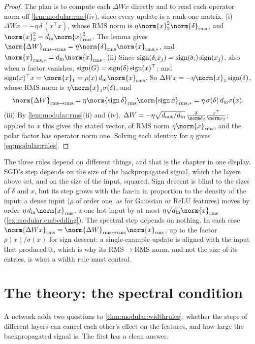 \begin{refsection}
\begin{proof}
The plan is to compute each $\Delta Wx$ directly and to read each operator norm off \cref{lem:modular:rms}(iv), since every update is a rank-one matrix. (i) $\Delta Wx=-\eta\,\delta\,(x^\top x)$, whose RMS norm is $\eta\norm{x}_2^2\norm{\delta}_\rms$, and $\norm{x}_2^2=\modularin\norm{x}_\rms^2$. The lemma gives $\norm{\Delta W}_{\rms\to\rms}=\eta\norm{\delta}_\rms\norm{x}_{\rms,*}$, and $\norm{x}_{\rms,*}=\modularin\norm{x}_\rms$. (ii) Since $\operatorname{sign}(\delta_ix_j)=\operatorname{sign}(\delta_i)\operatorname{sign}(x_j)$, also when a factor vanishes, $\operatorname{sign}(G)=\operatorname{sign}(\delta)\operatorname{sign}(x)^\top$; and $\sign(x)^\top x=\norm{x}_1=\rho(x)\,\modularin\norm{x}_\rms$. So $\Delta Wx=-\eta\norm{x}_1\sign(\delta)$, whose RMS norm is $\eta\norm{x}_1\sigma(\delta)$, and
\[
  \norm{\Delta W}_{\rms\to\rms}=\eta\norm{\sign\delta}_\rms\norm{\sign x}_{\rms,*}=\eta\,\sigma(\delta)\,\modularin\sigma(x).
\] (iii) By \cref{lem:modular:rms}(ii) and (iv), $\Delta W=-\eta\sqrt{\modularout/\modularin}\,\frac{\delta}{\norm\delta_2}\frac{x^\top}{\norm x_2}$; applied to $x$ this gives the stated vector, of RMS norm $\eta\norm{x}_\rms$, and the polar factor has operator norm one. Solving each identity for $\eta$ gives \eqref{eq:modular:rules}.
\end{proof}

The three rules depend on different things, and that is the chapter in one display. SGD's step depends on the size of the backpropagated signal, which the layers above set, and on the size of the input, squared. Sign descent is blind to the sizes of $\delta$ and $x$, but its step grows with the fan-in in proportion to the density of the input: a dense input ($\rho$ of order one, as for Gaussian or ReLU features) moves by order $\eta\,\modularin\norm{x}_\rms$, a one-hot input by at most $\eta\sqrt{\modularin}\norm{x}_\rms$ (\cref{ex:modular:embedding}). The spectral step depends on nothing. In each case $\norm{\Delta Wx}_\rms=\norm{\Delta W}_{\rms\to\rms}\norm{x}_\rms$, up to the factor $\rho(x)/\sigma(x)$ for sign descent: a single-example update is aligned with the input that produced it, which is why its RMS$\to$RMS norm, and not the size of its entries, is what a width rule must control.

\section{The theory: the spectral condition}\label{sec:modular:spectral}

A network adds two questions to \cref{thm:modular:widthrules}: whether the steps of different layers can cancel each other's effect on the features, and how large the backpropagated signal is. The first has a clean answer.


\end{refsection}

